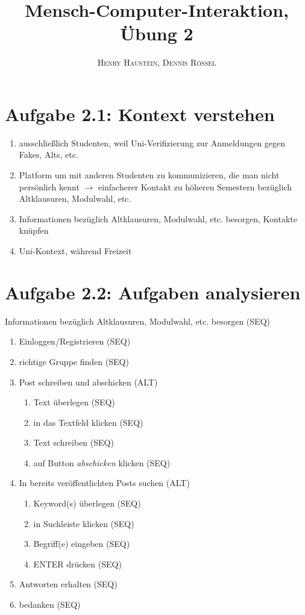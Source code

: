 \documentclass{article}
\title{\textbf{Mensch-Computer-Interaktion, Übung 2}}
\author{\textsc{Henry Haustein}, \textsc{Dennis Rössel}}
\date{}
\begin{document}
	\maketitle
	
	\section*{Aufgabe 2.1: Kontext verstehen}
	\begin{enumerate}[label=(\alph*)]
		\item ausschließlich Studenten, weil Uni-Verifizierung zur Anmeldungen gegen Fakes, Alts, etc.
		\item Platform um mit anderen Studenten zu kommunizieren, die man nicht persönlich kennt $\to$ einfacherer Kontakt zu höheren Semestern bezüglich Altklausuren, Modulwahl, etc.
		\item Informationen bezüglich Altklausuren, Modulwahl, etc. besorgen, Kontakte knüpfen
		\item Uni-Kontext, während Freizeit
	\end{enumerate}

	\section*{Aufgabe 2.2: Aufgaben analysieren}
	 Informationen bezüglich Altklausuren, Modulwahl, etc. besorgen (SEQ)
	 \begin{enumerate}
	 	\item Einloggen/Registrieren (SEQ)
	 	\item richtige Gruppe finden (SEQ)
	 	\item Post schreiben und abschicken (ALT)
	 	\begin{enumerate}
	 		\item Text überlegen (SEQ)
	 		\item in das Textfeld klicken (SEQ)
	 		\item Text schreiben (SEQ)
	 		\item auf Button \textit{abschicken} klicken (SEQ)
	 	\end{enumerate}
	 	\item In bereits veröffentlichten Posts suchen (ALT)
	 	\begin{enumerate}
	 		\item Keyword(s) überlegen (SEQ)
	 		\item in Suchleiste klicken (SEQ)
	 		\item Begriff(e) eingeben (SEQ)
	 		\item ENTER drücken (SEQ)
	 	\end{enumerate}
	 	\item Antworten erhalten (SEQ)
	 	\item bedanken (SEQ)
	 \end{enumerate}
	
\end{document}

